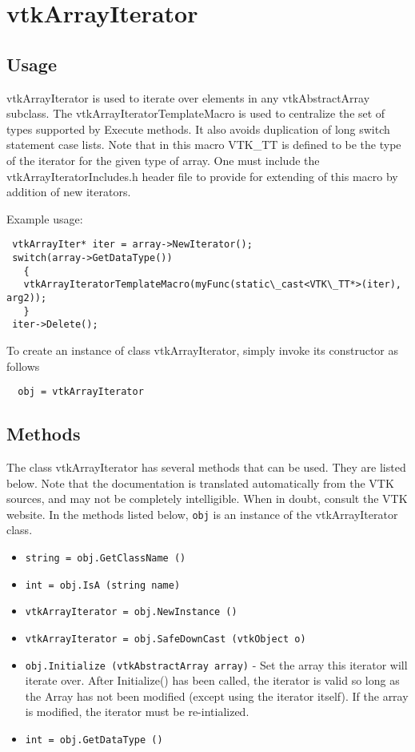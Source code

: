 \section{vtkArrayIterator}

\subsection{Usage}

 vtkArrayIterator is used to iterate over elements in any vtkAbstractArray
 subclass.
 The vtkArrayIteratorTemplateMacro is used to centralize the set of types
 supported by Execute methods.  It also avoids duplication of long
 switch statement case lists.
 Note that in this macro VTK\_TT is defined to be the type of the iterator
 for the given type of array. One must include the 
 vtkArrayIteratorIncludes.h header file to provide for extending of this macro
 by addition of new iterators.

 Example usage:
 \begin{verbatim}
 vtkArrayIter* iter = array->NewIterator();
 switch(array->GetDataType())
   {
   vtkArrayIteratorTemplateMacro(myFunc(static\_cast<VTK\_TT*>(iter), arg2));
   }
 iter->Delete();
 \end{verbatim}

To create an instance of class vtkArrayIterator, simply
invoke its constructor as follows
\begin{verbatim}
  obj = vtkArrayIterator
\end{verbatim}
\subsection{Methods}

The class vtkArrayIterator has several methods that can be used.
  They are listed below.
Note that the documentation is translated automatically from the VTK sources,
and may not be completely intelligible.  When in doubt, consult the VTK website.
In the methods listed below, \verb|obj| is an instance of the vtkArrayIterator class.
\begin{itemize}
\item  \verb|string = obj.GetClassName ()|

\item  \verb|int = obj.IsA (string name)|

\item  \verb|vtkArrayIterator = obj.NewInstance ()|

\item  \verb|vtkArrayIterator = obj.SafeDownCast (vtkObject o)|

\item  \verb|obj.Initialize (vtkAbstractArray array)| -  Set the array this iterator will iterate over.
 After Initialize() has been called, the iterator is valid
 so long as the Array has not been modified 
 (except using the iterator itself).
 If the array is modified, the iterator must be re-intialized.

\item  \verb|int = obj.GetDataType ()|

\end{itemize}
